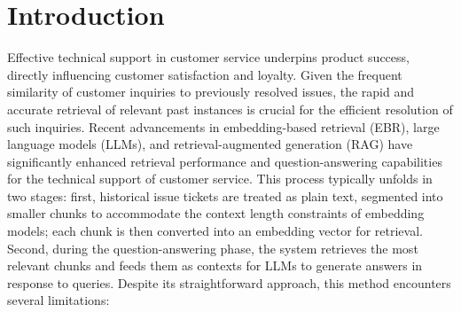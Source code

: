 \documentclass[sigconf]{acmart}
\begin{document}


	\maketitle


	\section{Introduction}

Effective technical support in customer service underpins product success, directly influencing customer satisfaction and loyalty. Given the frequent similarity of customer inquiries to previously resolved issues, the rapid and accurate retrieval of relevant past instances is crucial for the efficient resolution of such inquiries. Recent advancements in embedding-based retrieval (EBR), large language models (LLMs), and retrieval-augmented generation (RAG) \cite{lewis2020retrieval} have significantly enhanced retrieval performance and question-answering capabilities for the technical support of customer service. This process typically unfolds in two stages: first, historical issue tickets are treated as plain text, segmented into smaller chunks to accommodate the context length constraints of embedding models; each chunk is then converted into an embedding vector for retrieval. Second, during the question-answering phase, the system retrieves the most relevant chunks and feeds them as contexts for LLMs to generate answers in response to queries. Despite its straightforward approach, this method encounters several limitations:
\end{document}
